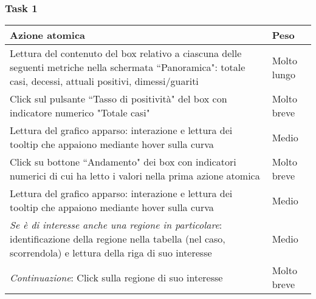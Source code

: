 \subsubsection{Task 1}
\label{sss:iaa-task-1}
{
\renewcommand{\arraystretch}{2}
\begin{longtable}[h]{| p{14cm} | p{2.5cm} |}
    \hline
    \textbf{Azione atomica} & \textbf{Peso} \\
    \hline
    \endhead
    Lettura del contenuto del box relativo a ciascuna delle seguenti metriche nella schermata ``Panoramica": totale casi, decessi, attuali positivi, dimessi/guariti & Molto lungo \\
    \hline
    Click sul pulsante ``Tasso di positività" del box con indicatore numerico "Totale casi" & Molto breve \\
    \hline
    Lettura del grafico apparso: interazione e lettura dei tooltip che appaiono mediante hover sulla curva & Medio \\
    \hline
    Click su bottone ``Andamento" dei box con indicatori numerici di cui ha letto i valori nella prima azione atomica & Molto breve \\
    \hline
    Lettura del grafico apparso: interazione e lettura dei tooltip che appaiono mediante hover sulla curva & Medio \\
    \hline
    \textit{Se è di interesse anche una regione in particolare}: identificazione della regione nella tabella (nel caso, scorrendola) e lettura della riga di suo interesse & Medio \\
    \hline
    \textit{Continuazione}: Click sulla regione di suo interesse & Molto breve \\
    \hline
\end{longtable}
}